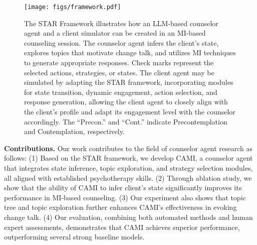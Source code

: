 \begin{figure*}
    \centering
    \texttt{[image: figs/framework.pdf]}
    \caption{The STAR Framework illustrates how an LLM-based counselor agent and a client simulator can be created in an MI-based counseling session. 
    The counselor agent infers the client's state, explores topics that motivate change talk, and utilizes MI techniques to generate appropriate responses. Check marks represent the selected actions, strategies, or states. The client agent may be simulated by adapting the STAR framework, incorporating modules for state transition, dynamic engagement, action selection, and response generation, allowing the client agent to closely align with the client's profile and adapt its engagement level with the counselor accordingly. The ``Precon.'' and ``Cont.'' indicate Precontemplation and Contemplation, respectively.}
    \label{fig:framework}
\end{figure*}

{\bf Contributions.}  Our work contributes to the field of counselor agent research as follows: (1) Based on the STAR framework, we develop CAMI, a counselor agent that integrates state inference, topic exploration, and strategy selection modules, all aligned with established psychotherapy skills. (2) Through ablation study, we show that the ability of CAMI to infer client's state significantly improves its performance in MI-based counseling. (3) Our experiment also shows that topic tree and topic exploration further enhances CAMI's effectiveness in evoking change talk. 
(4) Our evaluation, combining both automated methods and human expert assessments, demonstrates that CAMI achieves superior performance, outperforming several strong baseline models. 
